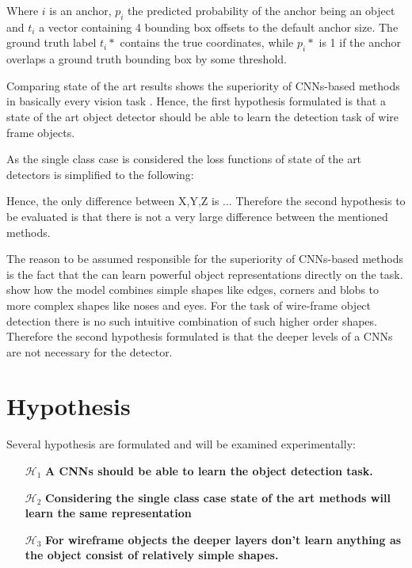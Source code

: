 	Where $i$ is an anchor, $p_i$ the predicted probability of the anchor being an object and $t_i$ a vector containing 4 bounding box offsets to the default anchor size. The ground truth label $t_i*$ contains the true coordinates, while $p_i*$ is 1 if the anchor overlaps a ground truth bounding box by some threshold. 


Comparing state of the art results shows the superiority of \acp{CNN}-based methods in basically every vision task . Hence, the first hypothesis formulated is that a state of the art object detector should be able to learn the detection task of wire frame objects. 

As the single class case is considered the loss functions of state of the art detectors is simplified to the following:


Hence, the only difference between X,Y,Z is ...
Therefore the second hypothesis to be evaluated is that there is not a very large difference between the mentioned methods.


The reason to be assumed responsible for the superiority of \acp{CNN}-based methods is the fact that the can learn powerful object representations directly on the task.  show how the model combines simple shapes like edges, corners and blobs to more complex shapes like noses and eyes. For the task of wire-frame object detection there is no such intuitive combination of such higher order shapes. Therefore the second hypothesis formulated is that the deeper levels of a \acp{CNN} are not necessary for the detector.

\section{Hypothesis}

\label{sec:object_detection:hypothesis}
Several hypothesis are formulated and will be examined experimentally:
\begin{enumerate}
	\item[$\mathcal{H}_1$] \textbf{A \acp{CNN} should be able to learn the object detection task.}
	\item[$\mathcal{H}_2$] \textbf{Considering the single class case state of the art methods will learn the same representation}
	\item[$\mathcal{H}_3$] \textbf{For wireframe objects the deeper layers don't learn anything as the object consist of relatively simple shapes.}
	
\end{enumerate}
\newpage
